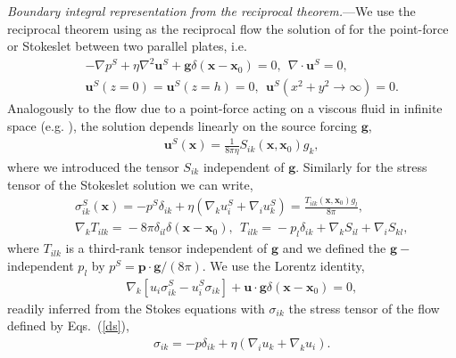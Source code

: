 {\it Boundary integral representation from the reciprocal theorem.}---We use the reciprocal theorem \citep{hb,ps} using as the reciprocal flow the solution of \cite{LironMochon} for the point-force or Stokeslet between two parallel plates, i.e.\
\begin{eqnarray}&&
-\nabla p^S+\eta \nabla^2 \bm u^S+\bm g\delta(\bm x-\bm x_0)=0,\ \ \nabla\cdot\bm u^S=0, \label{stokes}\\&& \bm u^S(z=0)=\bm u^S(z=h)=0,\ \ \bm u^S(x^2+y^2\to\infty)=0.\nonumber \end{eqnarray}
Analogously to the flow due to a point-force acting on a viscous fluid in infinite space (e.g. \cite{ps}), the solution depends linearly on the source forcing $\bm g$,
\begin{eqnarray}&&\!\!\!\!\!\!\!\!\!\!
\bm u^S(\bm x)=\frac{1}{8\pi \eta}S_{ik}(\bm x, \bm x_0)g_k, \label{vl}
\end{eqnarray}
where we introduced the tensor $S_{ik}$ independent of $\bm g$. Similarly for the stress tensor of the Stokeslet solution we can write,
\begin{eqnarray}&&
\sigma^S_{ik}(\bm x)\!=-p^S\delta_{ik}+\eta\left(\nabla_k u^S_i+\nabla_i u^S_k\right)\!=\!\frac{T_{ilk}(\bm x, \bm x_0)g_l}{8\pi},\label{st}\\&& \nabla_kT_{ilk}\!=\!-8\pi\delta_{il}\delta(\bm x\!-\!\bm x_0),\ \ T_{ilk}\!\!=\!\!-p_l \delta_{ik}\!+\!\nabla_k S_{il}\!+\!\nabla_i S_{kl},\nonumber
\end{eqnarray}
where $T_{ilk}$ is a third-rank tensor independent of $\bm g$ and we defined the $\bm g-$independent $p_l$ by $p^S=\bm p\cdot\bm g/(8\pi)$.
We use the Lorentz identity,
\begin{eqnarray}&&
\nabla_k\left[u_{i}\sigma^S_{ik}-u^S_i\sigma_{ik}\right]+\bm u\cdot \bm g\delta(\bm x-\bm x_0)=0,\label{lo}
\end{eqnarray}
readily inferred from the Stokes equations with $\sigma_{ik}$ the stress tensor of the flow defined by Eqs.~(\ref{ds}),
\begin{eqnarray}&&
\sigma_{ik}=-p\delta_{ik}+\eta\left(\nabla_iu_k+\nabla_ku_i\right).
\end{eqnarray}
